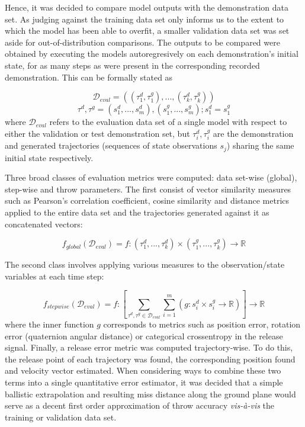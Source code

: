 \documentclass{article}
\begin{document}
Hence, it was decided to compare model outputs with the demonstration data set. As judging against the training data set only informs us to the extent to which the model has been able to overfit, a smaller validation data set was set aside for out-of-distribution comparisons. The outputs to be compared were obtained by executing the models autoregresively on each demonstration's initial state, for as many steps as were present in the corresponding recorded demonstration. This can be formally stated as

\begin{equation}
	\mathcal{D}_{eval} = \left ( (\tau^d_{1}, \tau^g_{1}), ..., (\tau^d_{k}, \tau^g_{k}) \right )
\end{equation}
\begin{equation}
	\tau^d, \tau^g = (s^d_1, ..., s^d_m), (s^g_1, ..., s^g_m); s^d_1 = s^g_1 
\end{equation}
where $\mathcal{D}_{eval}$ refers to the evaluation data set of a single model with respect to either the validation or test demonstration set, but $\tau^d_i, \tau^g_i$ are the demonstration and generated trajectories (sequences of state observations $s_j$) sharing the same initial state respectively.

Three broad classes of evaluation metrics were computed: data set-wise (global), step-wise and throw parameters. The first consist of vector similarity measures such as Pearson's correlation coefficient, cosine similarity and distance metrics applied to the entire data set and the trajectories generated against it as concatenated vectors:

\begin{equation}
	f_{global}(\mathcal{D}_{eval}) = f:(\tau^d_{1},...,\tau^d_{k}) \times (\tau^g_{1},...,\tau^g_{k}) \rightarrow \mathbb{R}
\end{equation}

The second class involves applying various measures to the observation/state variables at each time step:

\begin{equation}
	f_{stepwise}(\mathcal{D}_{eval}) = f: \left [ \sum_{\tau^d, \tau^g \in \mathcal{D}_{eval}}\sum_{i=1}^m \left ( g:s^d_i \times s^g_i \rightarrow \mathbb{R} \right ) \right ] \rightarrow \mathbb{R}
\end{equation}
where the inner function $g$ corresponds to metrics such as position error, rotation error (quaternion angular distance) or categorical crossentropy in the release signal. Finally, a release error metric was computed trajectory-wise. To do this, the release point of each trajectory was found, the corresponding position found and velocity vector estimated. When considering ways to combine these two terms into a single quantitative error estimator, it was decided that a simple ballistic extrapolation and resulting miss distance along the ground plane would serve as a decent first order approximation of throw accuracy \emph{vis-à-vis} the training or validation data set.
\end{document}

